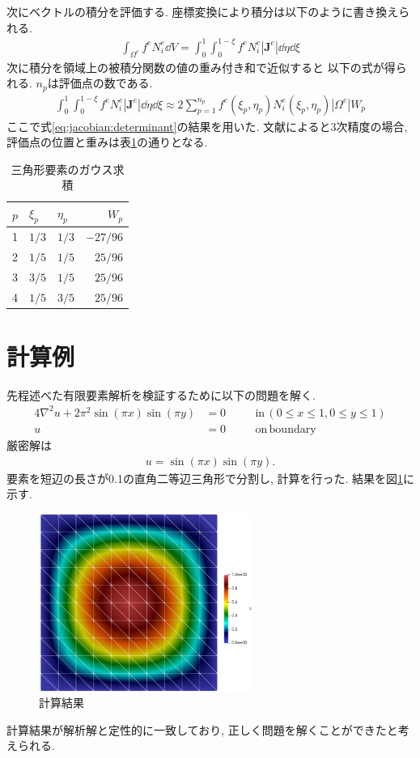 \documentclass[paper=a4]{jlreq}
\begin{document}
次にベクトルの積分を評価する. 座標変換により積分は以下のように書き換えられる.
\begin{align}
    \int_{\Omega^e} f^eN_i^e\dd{V}
    = \int_0^1\int_0^{1-\xi}f^eN_i^e|\bm{J}^e|\dd{\eta}\dd{\xi} 
\end{align}
次に積分を領域上の被積分関数の値の重み付き和で近似すると
以下の式が得られる. $n_p$は評価点の数である.
\begin{align}
    \int_0^1\int_0^{1-\xi}f^eN_i^e|\bm{J}^e|\dd{\eta}\dd{\xi} 
    \approx 2\sum_{p=1}^{n_p}f^e(\xi_p,\eta_p)N_i^e(\xi_p,\eta_p)|\Omega^e|W_p
\end{align}
ここで式\eqref{eq:jacobian:determinant}の結果を用いた.
文献\cite{Wriggers2006}によると3次精度の場合,
評価点の位置と重みは表\ref{tab:gauss_quadrature}の通りとなる.
\begin{table}[htbp]
    \centering
    \caption{三角形要素のガウス求積}
    \label{tab:gauss_quadrature}
    \begin{tabular}{lllr}
        \hline
        $p$ & $\xi_p$ &  $\eta_p$ & $W_p$ \\ \hline
        1 & $1/3$ & $1/3$ & $-27/96$ \\
        2 & $1/5$ & $1/5$ & $25/96$ \\
        3 & $3/5$ & $1/5$ & $25/96$ \\
        4 & $1/5$ & $3/5$ & $25/96$ \\ \hline
    \end{tabular}
\end{table}


\section{計算例}
先程述べた有限要素解析を検証するために以下の問題を解く.
\begin{alignat}{4}
    \nabla^2 u + 2\pi^2\sin(\pi x)\sin(\pi y) &= 0 &\quad& \mathrm{in}\, (0\leq x \leq 1, 0\leq y\leq 1) \\
    u &= 0 &\quad& \mathrm{on\,boundary}
\end{alignat}
厳密解は
\begin{align}
    u = \sin(\pi x)\sin(\pi y).
\end{align}
要素を短辺の長さが0.1の直角二等辺三角形で分割し, 計算を行った.
結果を図\ref{fig:visualization}に示す.
\begin{figure}[htbp]
    \centering
    \includegraphics[width=7cm]{visualization.png}
    \caption{計算結果}
    \label{fig:visualization}
\end{figure}
計算結果が解析解と定性的に一致しており, 正しく問題を解くことができたと考えられる.
\end{document}
